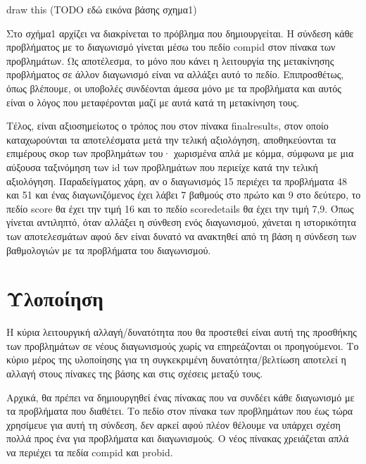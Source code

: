 \documentclass[diploma]{softlab-thesis}
\begin{document}
\bigskip

draw this
(TODO εδώ εικόνα βάσης σχημα1)

\bigskip

Στο σχήμα1 αρχίζει να διακρίνεται το πρόβλημα που δημιουργείται. Η σύνδεση
κάθε προβλήματος με το διαγωνισμό γίνεται μέσω του πεδίο compid στον πίνακα
των προβλημάτων. Ως αποτέλεσμα, το μόνο που κάνει η λειτουργία της μετακίνησης
προβλήματος σε άλλον διαγωνισμό είναι να αλλάξει αυτό το πεδίο. Επιπροσθέτως,
όπως βλέπουμε, οι υποβολές συνδέονται άμεσα μόνο με τα προβλήματα και αυτός
είναι ο λόγος που μεταφέρονται μαζί με αυτά κατά τη μετακίνηση τους.

\bigskip

Τέλος, είναι αξιοσημείωτος ο τρόπος που στον πίνακα finalresults, στον
οποίο καταχωρούνται τα αποτελέσματα μετά την τελική αξιολόγηση, αποθηκεύονται
τα επιμέρους σκορ των προβλημάτων του· χωρισμένα απλά με κόμμα, σύμφωνα με μια
αύξουσα ταξινόμηση των id των προβλημάτων που περιείχε κατά την τελική αξιολόγηση.
Παραδείγματος χάρη, αν ο διαγωνισμός 15 περιέχει τα προβλήματα 48 και 51 και ένας
διαγωνιζόμενος έχει λάβει 7 βαθμούς στο πρώτο και 9 στο δεύτερο, το πεδίο score θα
έχει την τιμή 16 και το πεδίο scoredetails θα έχει την τιμή 7,9. Όπως γίνεται
αντιληπτό, όταν αλλάξει η σύνθεση ενός διαγωνισμού, χάνεται η ιστορικότητα των
αποτελεσμάτων αφού δεν είναι δυνατό να ανακτηθεί από τη βάση η σύνδεση των
βαθμολογιών με τα προβλήματα του διαγωνισμού.

\bigskip

\section{Υλοποίηση}

Η κύρια λειτουργική αλλαγή/δυνατότητα που θα προστεθεί είναι αυτή της προσθήκης
των προβλημάτων σε νέους διαγωνισμούς χωρίς να επηρεάζονται οι προηγούμενοι.
Το κύριο μέρος της υλοποίησης για τη συγκεκριμένη δυνατότητα/βελτίωση αποτελεί
η αλλαγή στους πίνακες της βάσης και στις σχέσεις μεταξύ τους.

\bigskip

Αρχικά, θα πρέπει να δημιουργηθεί ένας πίνακας που να συνδέει κάθε διαγωνισμό
με τα προβλήματα που διαθέτει. Το πεδίο στον πίνακα των προβλημάτων που έως
τώρα χρησίμευε για αυτή τη σύνδεση, δεν αρκεί αφού πλέον θέλουμε να υπάρχει
σχέση πολλά προς ένα για προβλήματα και διαγωνισμούς. Ο νέος πίνακας χρειάζεται
απλά να περιέχει τα πεδία compid και probid.

\bigskip
\end{document}
